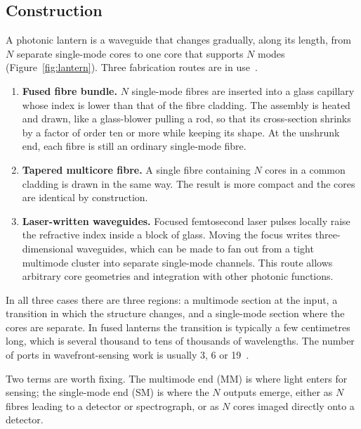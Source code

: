 \documentclass[11pt,a4paper]{article}
\begin{document}
\subsection{Construction}
A photonic lantern is a waveguide that changes gradually, along its length, from $N$ separate single-mode cores to one core that supports $N$ modes (Figure~\ref{fig:lantern}). Three fabrication routes are in use~\cite{LeonSaval2013,Birks2015}.
\begin{enumerate}
\item \textbf{Fused fibre bundle.} $N$ single-mode fibres are inserted into a glass capillary whose index is lower than that of the fibre cladding. The assembly is heated and drawn, like a glass-blower pulling a rod, so that its cross-section shrinks by a factor of order ten or more while keeping its shape. At the unshrunk end, each fibre is still an ordinary single-mode fibre.
\item \textbf{Tapered multicore fibre.} A single fibre containing $N$ cores in a common cladding is drawn in the same way. The result is more compact and the cores are identical by construction.
\item \textbf{Laser-written waveguides.} Focused femtosecond laser pulses locally raise the refractive index inside a block of glass. Moving the focus writes three-dimensional waveguides, which can be made to fan out from a tight multimode cluster into separate single-mode channels. This route allows arbitrary core geometries and integration with other photonic functions.
\end{enumerate}
In all three cases there are three regions: a multimode section at the input, a transition in which the structure changes, and a single-mode section where the cores are separate. In fused lanterns the transition is typically a few centimetres long, which is several thousand to tens of thousands of wavelengths. The number of ports in wavefront-sensing work is usually 3, 6 or 19~\cite{Norris2020,Lin2022,Lin2023,Lin2023PRL}.

Two terms are worth fixing. The multimode end (MM) is where light enters for sensing; the single-mode end (SM) is where the $N$ outputs emerge, either as $N$ fibres leading to a detector or spectrograph, or as $N$ cores imaged directly onto a detector.
\end{document}

